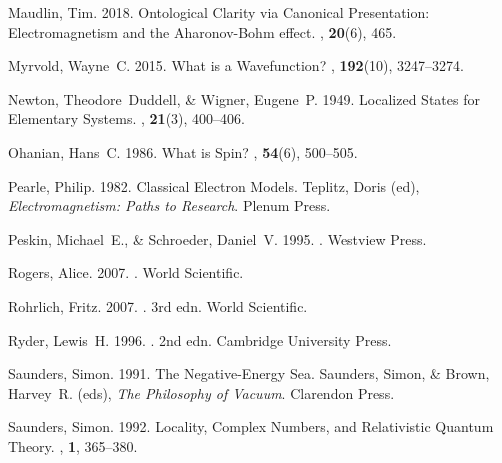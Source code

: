 \documentclass[onecolumn,secnumarabic,amsmath,amssymb,balancelastpage,nofootinbib]{article}
\begin{document}
\begin{thebibliography}{}
Maudlin, Tim. 2018.
\newblock Ontological Clarity via Canonical Presentation: Electromagnetism and
  the Aharonov-Bohm effect.
, {\bf 20}(6), 465.

Myrvold, Wayne~C. 2015.
\newblock What is a Wavefunction?
, {\bf 192}(10), 3247--3274.

Newton, Theodore~Duddell, \& Wigner, Eugene~P. 1949.
\newblock Localized States for Elementary Systems.
, {\bf 21}(3), 400--406.

Ohanian, Hans~C. 1986.
\newblock What is Spin?
, {\bf 54}(6), 500--505.

Pearle, Philip. 1982.
\newblock Classical Electron Models.
 Teplitz, Doris (ed), {\em Electromagnetism:
  Paths to Research}.
\newblock Plenum Press.

Peskin, Michael~E., \& Schroeder, Daniel~V. 1995.
.
\newblock Westview Press.

Rogers, Alice. 2007.
.
\newblock World Scientific.

Rohrlich, Fritz. 2007.
. 3rd edn.
\newblock World Scientific.

Ryder, Lewis~H. 1996.
. 2nd edn.
\newblock Cambridge University Press.

Saunders, Simon. 1991.
\newblock The Negative-Energy Sea.
 Saunders, Simon, \& Brown, Harvey~R. (eds),
  {\em The Philosophy of Vacuum}.
\newblock Clarendon Press.

Saunders, Simon. 1992.
\newblock Locality, Complex Numbers, and Relativistic Quantum Theory.
, {\bf 1}, 365--380.


\end{thebibliography}
\end{document}

